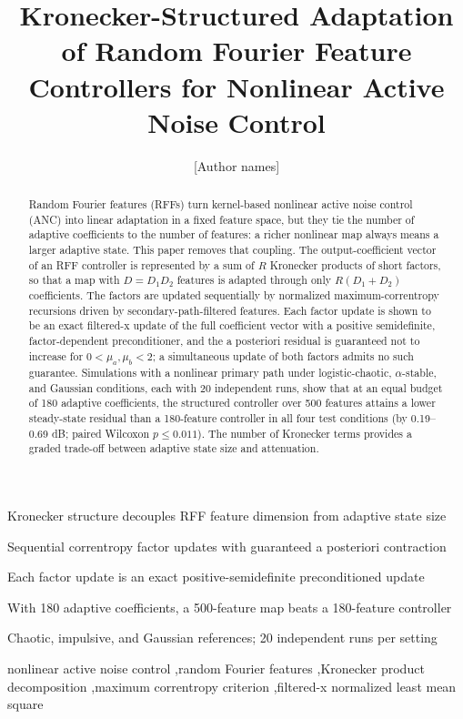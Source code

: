 \documentclass[preprint,12pt]{elsarticle}
\begin{document}
\begin{frontmatter}
\title{Kronecker-Structured Adaptation of Random Fourier Feature Controllers for Nonlinear Active Noise Control}
\author{ [Author names]}
\address{ [Department, institution, city, postal code, country]}
\begin{highlights}
\item Kronecker structure decouples RFF feature dimension from adaptive state size
\item Sequential correntropy factor updates with guaranteed a posteriori contraction
\item Each factor update is an exact positive-semidefinite preconditioned update
\item With 180 adaptive coefficients, a 500-feature map beats a 180-feature controller
\item Chaotic, impulsive, and Gaussian references; 20 independent runs per setting
\end{highlights}
\begin{abstract}
Random Fourier features (RFFs) turn kernel-based nonlinear active noise control (ANC) into linear adaptation in a fixed feature space, but they tie the number of adaptive coefficients to the number of features: a richer nonlinear map always means a larger adaptive state. This paper removes that coupling. The output-coefficient vector of an RFF controller is represented by a sum of $R$ Kronecker products of short factors, so that a map with $D = D_1 D_2$ features is adapted through only $R(D_1 + D_2)$ coefficients. The factors are updated sequentially by normalized maximum-correntropy recursions driven by secondary-path-filtered features. Each factor update is shown to be an exact filtered-x update of the full coefficient vector with a positive semidefinite, factor-dependent preconditioner, and the a posteriori residual is guaranteed not to increase for $0 < \mu_a, \mu_b < 2$; a simultaneous update of both factors admits no such guarantee. Simulations with a nonlinear primary path under logistic-chaotic, $\alpha$-stable, and Gaussian conditions, each with 20 independent runs, show that at an equal budget of 180 adaptive coefficients, the structured controller over 500 features attains a lower steady-state residual than a 180-feature controller in all four test conditions (by 0.19–0.69 dB; paired Wilcoxon $p \le 0.011$). The number of Kronecker terms provides a graded trade-off between adaptive state size and attenuation.
\end{abstract}
\begin{keyword}
nonlinear active noise control \sep random Fourier features \sep Kronecker product decomposition \sep maximum correntropy criterion \sep filtered-x normalized least mean square
\end{keyword}
\end{frontmatter}
\end{document}

